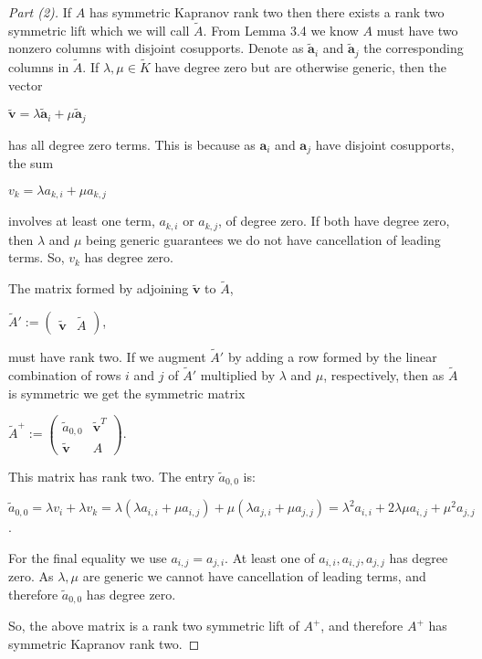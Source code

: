 \documentclass{article}
\begin{document}
\begin{proof}[Part (2)]
  If $A$ has symmetric Kapranov rank two then there exists a rank two symmetric lift which we will call $\tilde{A}$. From Lemma 3.4 we know $A$ must have two nonzero columns with disjoint cosupports. Denote as $\tilde{\textbf{a}}_{i}$ and $\tilde{\textbf{a}}_{j}$ the corresponding columns in $\tilde{A}$. If $\lambda, \mu \in \tilde{K}$ have degree zero but are otherwise generic, then the vector
  \begin{center}
    $\tilde{\textbf{v}} = \lambda\tilde{\textbf{a}}_{i} + \mu\tilde{\textbf{a}}_{j}$
  \end{center}
  has all degree zero terms. This is because as $\textbf{a}_{i}$ and $\textbf{a}_{j}$ have disjoint cosupports, the sum
  \begin{center}
    $v_{k} = \lambda a_{k,i} + \mu a_{k,j}$
  \end{center}
  involves at least one term, $a_{k,i}$ or $a_{k,j}$, of degree zero. If both have degree zero, then $\lambda$ and $\mu$ being generic guarantees we do not have cancellation of leading terms. So, $v_{k}$ has degree zero.

  The matrix formed by adjoining $\tilde{\textbf{v}}$ to $\tilde{A}$,
  \begin{center}
    $\tilde{A}' := \left(\begin{array}{cc} \tilde{\textbf{v}} & \tilde{A} \end{array}\right)$,
  \end{center}
  must have rank two. If we augment $\tilde{A}'$ by adding a row formed by the linear combination of rows $i$ and $j$ of $\tilde{A}'$ multiplied by $\lambda$ and $\mu$, respectively, then as $\tilde{A}$ is symmetric we get the symmetric matrix
  \begin{center}
    $\tilde{A}^{+} := \left(\begin{array}{cc} \tilde{a}_{0,0} & \tilde{\textbf{v}}^{T} \\ \tilde{\textbf{v}} & A \end{array}\right)$.
  \end{center}
  This matrix has rank two. The entry $\tilde{a}_{0,0}$ is:
  \begin{center}
    $\tilde{a}_{0,0} = \lambda v_{i} + \lambda v_{k} = \lambda (\lambda a_{i,i} + \mu a_{i,j}) + \mu (\lambda a_{j,i} + \mu a_{j,j}) = \lambda^{2}a_{i,i} + 2\lambda\mu a_{i,j} + \mu^{2}a_{j,j}$.
  \end{center}
  For the final equality we use $a_{i,j} = a_{j,i}$. At least one of $a_{i,i}, a_{i,j}, a_{j,j}$ has degree zero. As $\lambda, \mu$ are generic we cannot have cancellation of leading terms, and therefore $\tilde{a}_{0,0}$ has degree zero.
  
  So, the above matrix is a rank two symmetric lift of $A^{+}$, and therefore $A^{+}$ has symmetric Kapranov rank two.
\end{proof}
\end{document}
